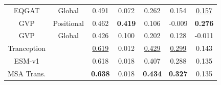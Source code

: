 \begin{table}[!htb]
\begin{center}
\begin{small}
\begin{sc}
\begin{tabular}{@{}ccccccc@{}}
EQGAT                  & Global                                                                       & 0.491                                                                       & 0.072                                                                    & 0.262          & 0.154                                                    & \underline{0.157}                                               \\
GVP                    & Positional                                                                   & 0.462                                                                       & \textbf{0.419}                                                           & 0.106          & -0.009                                                   & \textbf{0.276}                                            \\
GVP                    & Global                                                                       & 0.426                                                                       & 0.100                                                                    & 0.202          & 0.128                                                    & -0.011                                                    \\ \midrule
Tranception            &                                                                              & \underline{0.619}                                                                 & 0.012                                                                    & \underline{0.429}    & \underline{0.299}                                              & 0.143                                                     \\
ESM-v1                 &                                                                              & 0.618                                                                       & 0.018                                                                    & 0.407          & 0.288                                                    & 0.135                                                     \\
MSA Trans.        &                                                                              & \textbf{0.638}                                                              & 0.018                                                                    & \textbf{0.434} & \textbf{0.327}                                           & 0.135                                                     \\ \bottomrule
\end{tabular}
\end{sc}
\end{small}
\end{center}
\vskip -0.1in
\end{table}




